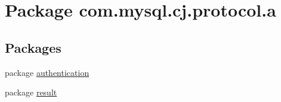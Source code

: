 \hypertarget{namespacecom_1_1mysql_1_1cj_1_1protocol_1_1a}{}\section{Package com.\+mysql.\+cj.\+protocol.\+a}
\label{namespacecom_1_1mysql_1_1cj_1_1protocol_1_1a}
\subsection*{Packages}
\begin{DoxyCompactItemize}
\item 
package \mbox{\hyperlink{namespacecom_1_1mysql_1_1cj_1_1protocol_1_1a_1_1authentication}{authentication}}
\item 
package \mbox{\hyperlink{namespacecom_1_1mysql_1_1cj_1_1protocol_1_1a_1_1result}{result}}
\end{DoxyCompactItemize}

